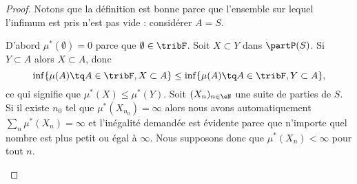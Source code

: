\begin{proof}
	Notons que la définition est bonne parce que l'ensemble sur lequel l'infimum est pris n'est pas vide : considérer \( A=S\).
	\begin{subproof}
		\spitem[Le vide]
		D'abord \( \mu^*(\emptyset)=0\) parce que \( \emptyset\in\tribF\).
		Soit \( X\subset Y\) dans \( \partP(S)\). Si \( Y\subset A\) alors \( X\subset A\), donc
		\begin{equation}
			\inf \{ \mu(A)\tq A\in\tribF,X\subset A \}\leq \inf \{ \mu(A)\tq A\in\tribF,Y\subset A \},
		\end{equation}
		ce qui signifie que \( \mu^*(X)\leq \mu^*(Y)\).
		Soit \( (X_n)_{n\in \eN}\) une suite de parties de \( S\). Si il existe \( n_0\) tel que \( \mu^*(X_{n_0})=\infty\) alors nous avons automatiquement \( \sum_n\mu^*(X_n)=\infty\) et l'inégalité demandée est évidente parce que n'importe quel nombre est plus petit ou égal à \( \infty\). Nous supposons donc que \( \mu^*(X_n)<\infty\) pour tout \( n\).


\end{subproof}
\end{proof}
